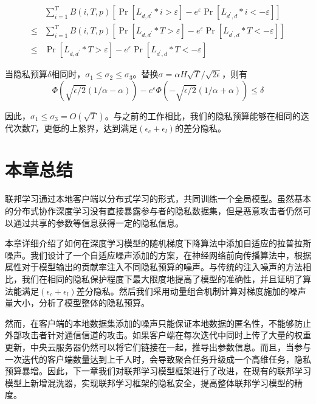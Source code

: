 \begin{equation}\label{eq:隐私预算计算3}
\begin{aligned}
& \sum_{i=1}^{T} B(i, T, p)\left[\operatorname{Pr}\left[L_{d, d^{\prime}} * i>\varepsilon\right]-e^{\varepsilon} \operatorname{Pr}\left[L_{d^{\prime}, d} * i<-\varepsilon\right]\right] \\
\leq & \sum_{i=1}^{T} B(i, T, p)\left[\operatorname{Pr}\left[L_{d, d^{\prime}} * T>\varepsilon\right]-e^{\varepsilon} \operatorname{Pr}\left[L_{d^{\prime}, d} * T<-\varepsilon\right]\right] \\
\leq & \operatorname{Pr}\left[L_{d, d^{\prime}} * T>\varepsilon\right]-e^{\varepsilon} \operatorname{Pr}\left[L_{d^{\prime}, d} * T<-\varepsilon\right]
\end{aligned}
\end{equation}

当隐私预算$\delta$相同时，$\sigma_{1} \leq \sigma_{2} \leq \sigma_{3}$。替换$\sigma=\alpha H \sqrt{T} / \sqrt{2 \epsilon}$，则有
\begin{equation}\label{eq:隐私预算计算4}
\Phi(\sqrt{\epsilon / 2}(1 / \alpha-\alpha))-e^{\varepsilon} \Phi(-\sqrt{\epsilon / 2}(1 / \alpha+\alpha)) \leq \delta
\end{equation}

因此，$\sigma_{1} \leq \sigma_{3}=O(\sqrt{T})$。与之前的工作相比，我们的隐私预算能够在相同的迭代次数$T$，更低的上紧界，达到满足$\left(\epsilon_{c}+\epsilon_{l}\right)$的差分隐私。

\section{本章总结}
联邦学习通过本地客户端以分布式学习的形式，共同训练一个全局模型。虽然基本的分布式协作深度学习没有直接暴露参与者的隐私数据集，但是恶意攻击者仍然可以通过共享的参数等信息获得一定的隐私信息。 

本章详细介绍了如何在深度学习模型的随机梯度下降算法中添加自适应的拉普拉斯噪声。我们设计了一个自适应噪声添加的方案，在神经网络前向传播算法中，根据属性对于模型输出的贡献率注入不同隐私预算的噪声。与传统的注入噪声的方法相比，我们在相同的隐私保护程度下最大限度地提高了模型的准确性，并且证明了算法能满足$\left(\epsilon_{c}+\epsilon_{l}\right)$差分隐私。然后我们采用动量组合机制计算对梯度施加的噪声量大小，分析了模型整体的隐私预算。

然而，在客户端的本地数据集添加的噪声只能保证本地数据的匿名性，不能够防止外部攻击者针对通信信道的攻击。如果客户端在每次迭代中同时上传了大量的权重更新，中央云服务器仍然可以将它们链接在一起，推导出参数信息。而且，当参与一次迭代的客户端数量达到上千人时，会导致聚合任务升级成一个高维任务，隐私预算暴增。因此，下一章我们对联邦学习模型框架进行了改进，在现有的联邦学习模型上新增混洗器，实现联邦学习框架的隐私安全，提高整体联邦学习模型的精度。


